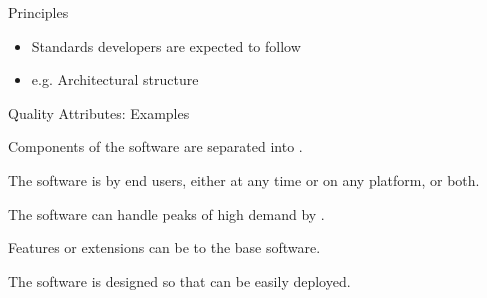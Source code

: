 \documentclass{slide}
\begin{document}
\begin{frame}{Principles}
\Large{
\begin{itemize}
    \item Standards developers are expected to follow
	\vspace{0.3em}
    \item e.g. Architectural structure
\end{itemize}
}
\end{frame}




\begin{frame}{Quality Attributes: Examples}
\large{
\begin{description}[<+->]
    \setlength\itemsep{0.35em}
    \item[Modularity] Components of the software are separated into .
    \item[Availability] The software is  by end users, either at any time or on any platform, or both.
    \item[Scalability] The software can handle peaks of high demand by .
    \item[Extensibility] Features or extensions can be  to the base software.
    \item[Testibility] The software is designed so that  can be easily deployed.
\end{description}
}
\end{frame}



\end{document}
